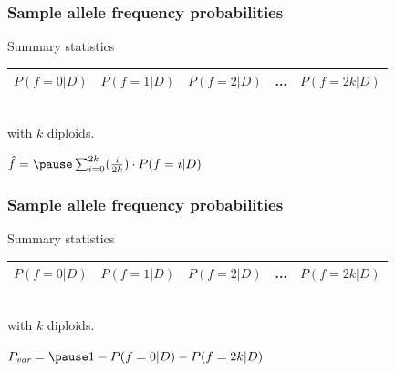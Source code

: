 \begin{frame}
\frametitle{Sample allele frequency probabilities}

	Summary statistics

	\small{
	\begin{center}
                \begin{tabular}{| c | c | c | c | c |}
                        \hline
                        $P(f=0|D)$ & $P(f=1|D)$ & $P(f=2|D)$ & ... & $P(f=2k|D)$\\
                        \hline
                \end{tabular}\\
                with $k$ diploids.
        \end{center}
	}

	\begin{center}
		\Large{
		$\hat{f} = \pause \sum_{i=0}^{2k} (\frac{i}{2k}) \cdot P(f=i|D) $
		}
	\end{center}

\end{frame}


\begin{frame}
\frametitle{Sample allele frequency probabilities}

        Summary statistics

        \small{
        \begin{center}
                \begin{tabular}{| c | c | c | c | c |}
                        \hline
                        $P(f=0|D)$ & $P(f=1|D)$ & $P(f=2|D)$ & ... & $P(f=2k|D)$\\
                        \hline
                \end{tabular}\\
                with $k$ diploids.
        \end{center}
        }

        \begin{center}
                \Large{
                $P_{\textit{var}} = \pause 1 - P(f=0|D) - P(f=2k|D) $
                }
        \end{center}

\end{frame}



